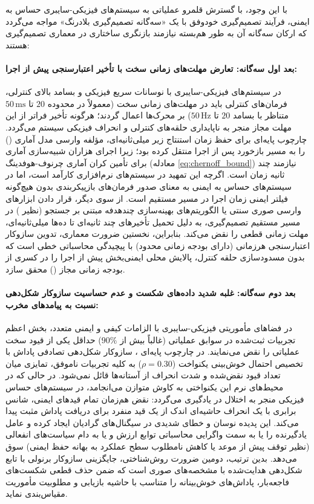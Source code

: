 \documentclass[oneside,openany,phd]{TMU-Thesis}
\begin{document}
با این وجود، با گسترش قلمرو عملیاتی به سیستم‌های فیزیکی-سایبری حساس به ایمنی، فرآیند تصمیم‌گیری خودوفق با یک «سه‌گانه تصمیم‌گیری بلادرنگ» مواجه می‌گردد که ارکان سه‌گانه آن به طور هم‌بسته نیازمند بازنگری ساختاری در معماری تصمیم‌گیری هستند:

\paragraph{بعد اول سه‌گانه: تعارض مهلت‌های زمانی سخت با تأخیر اعتبارسنجی پیش از اجرا:}
در سیستم‌های فیزیکی-سایبری با نوسانات سریع فیزیکی و بسامد بالای کنترلی، فرمان‌های کنترلی باید در مهلت‌های زمانی سخت (معمولاً در محدوده $20$ تا $50\,\text{ms}$ متناظر با بسامد $20$ تا $50\,\text{Hz}$) بر محرک‌ها اعمال گردند؛ هرگونه تأخیر فراتر از این مهلت مجاز منجر به ناپایداری حلقه‌های کنترلی و انحراف فیزیکی سیستم می‌گردد. چارچوب پایه‌ای  برای حفظ زمان استنتاج زیر میلی‌ثانیه‌ای، مؤلفه وارسی مدل آماری () را به مسیر بازخورد پس از اجرا منتقل کرده بود؛ زیرا اجرای هزاران شبیه‌سازی آماری برای تأمین کران آماری چرنوف-هوفدینگ (معادله \ref{eq:chernoff_bound}) نیازمند چند ثانیه زمان است. اگرچه این تمهید در سیستم‌های نرم‌افزاری کارآمد است، اما در سیستم‌های حساس به ایمنی به معنای صدور فرمان‌های بازپیکربندی بدون هیچ‌گونه فیلتر ایمنی زمان اجرا در مسیر مستقیم است. از سوی دیگر، قرار دادن ابزارهای وارسی صوری سنتی یا الگوریتم‌های بهینه‌سازی چندهدفه مبتنی بر جستجو (نظیر ) در مسیر مستقیم تصمیم‌گیری، به دلیل تحمیل تأخیرهای چند ثانیه‌ای تا ده‌ها میلی‌ثانیه‌ای، مهلت زمانی قطعی را نقض می‌کند. بنابراین، نخستین ضرورت معماری، تدوین سازوکار اعتبارسنجی هرزمانی (دارای بودجه زمانی محدود) با پیچیدگی محاسباتی خطی است که بدون مسدودسازی حلقه کنترل، پالایش محلی ایمنی‌بخش پیش از اجرا را در کسری از بودجه زمانی مجاز () محقق سازد.

\paragraph{بعد دوم سه‌گانه: غلبه شدید داده‌های شکست و عدم حساسیت سازوکار شکل‌دهی نسبت به پیامدهای مخرب:}
در فضاهای مأموریتی فیزیکی-سایبری با الزامات کیفی و ایمنی متعدد، بخش اعظم تجربیات ثبت‌شده در سوابق عملیاتی (غالباً بیش از $90\%$) حداقل یکی از قیود سخت عملیاتی را نقض می‌نمایند. در چارچوب پایه‌ای ، سازوکار شکل‌دهی تصادفی پاداش با تخصیص احتمال خوش‌بینی یکنواخت ($\rho = 0.30$) به کلیه تجربیات ناموفق، تمایزی میان تعداد قیود نقض‌شده و شدت انحراف از آستانه‌ها قائل نمی‌شود. در حالی که در محیط‌های نرم این یکنواختی به کاوش متوازن می‌انجامد، در سیستم‌های حساس فیزیکی منجر به اختلال در یادگیری می‌گردد: نقض هم‌زمان تمام قیدهای ایمنی، شانس برابری با یک انحراف حاشیه‌ای اندک از یک قید منفرد برای دریافت پاداش مثبت پیدا می‌کند. این پدیده نوسان و خطای شدیدی در سیگنال‌های گرادیان ایجاد کرده و عامل یادگیرنده را یا به سمت واگرایی محاسباتی توابع ارزش و یا به دام سیاست‌های انفعالی (نظیر توقف پیش از موعد یا کاهش نامطلوب سطح عملکرد به بهانه حفظ ایمنی) سوق می‌دهد. بدین ترتیب، دومین ضرورت روش‌شناختی، جایگزینی سازوکار برنولی با تابع شکل‌دهی هدایت‌شده با مشخصه‌های صوری است که ضمن حذف قطعی شکست‌های فاجعه‌بار، پاداش‌های خوش‌بینانه را متناسب با حاشیه بازیابی و مطلوبیت مأموریت مقیاس‌بندی نماید.
\end{document}
